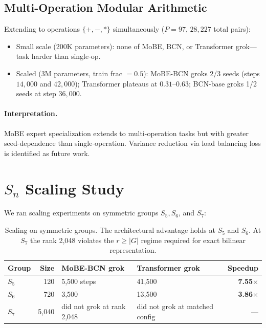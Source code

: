 \documentclass[11pt]{article}
\begin{document}
\subsection{Multi-Operation Modular Arithmetic}

Extending to operations $\{+, -, \ast\}$ simultaneously ($P = 97$,
$28{,}227$ total pairs):
\begin{itemize}
\item Small scale (200K parameters): none of MoBE, BCN, or Transformer
    grok---task harder than single-op.
\item Scaled (3M parameters, train frac $=0.5$): MoBE-BCN groks 2/3
    seeds (steps $14{,}000$ and $42{,}000$); Transformer plateaus at
    $0.31$--$0.63$; BCN-base groks 1/2 seeds at step $36{,}000$.
\end{itemize}

\paragraph{Interpretation.}
MoBE expert specialization extends to multi-operation tasks but with
greater seed-dependence than single-operation. Variance reduction via
load balancing loss is identified as future work.

\section{$S_n$ Scaling Study}
\label{sec:scaling}

We ran scaling experiments on symmetric groups $S_5, S_6$, and $S_7$:

\begin{table}[h]
\centering
\begin{tabular}{lrllr}
\toprule
\textbf{Group} & \textbf{Size} & \textbf{MoBE-BCN grok} & \textbf{Transformer grok} & \textbf{Speedup} \\
\midrule
$S_5$ & 120   & 5{,}500 steps & 41{,}500 & \textbf{7.55$\times$} \\
$S_6$ & 720   & 3{,}500       & 13{,}500 & \textbf{3.86$\times$} \\
$S_7$ & 5{,}040 & did not grok at rank 2{,}048 & did not grok at matched config & --- \\
\bottomrule
\end{tabular}
\caption{Scaling on symmetric groups. The architectural advantage
holds at $S_5$ and $S_6$. At $S_7$ the rank 2{,}048 violates the
$r \geq |G|$ regime required for exact bilinear representation.}
\label{tab:scaling}
\end{table}
\end{document}
